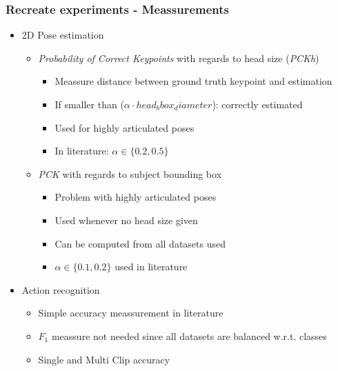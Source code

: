 \documentclass[9pt]{beamer}
\newenvironment{myframe}[1][]{%
\begin{frame}%
\frametitle{#1}
\setcounter{footnote}{0}


}{%
\end{frame}%
}
\begin{document}
\begin{myframe}[Recreate experiments - Meassurements]
    \begin{itemize}
        \item 2D Pose estimation
        \begin{itemize}
            \item \textit{Probability of Correct Keypoints} with regards to head size (\textit{PCKh})
            \begin{itemize}
                \item Meassure distance between ground truth keypoint and estimation
                \item If smaller than ($\alpha \cdot head_bbox_diameter$): correctly estimated
                \item Used for highly articulated poses
                \item In literature: $\alpha \in \{0.2, 0.5\}$
            \end{itemize}    
            \item \textit{PCK} with regards to subject bounding box
            \begin{itemize}
                \item Problem with highly articulated poses
                \item Used whenever no head size given
                \item Can be computed from all datasets used
                \item $\alpha \in \{0.1, 0.2\}$ used in literature
            \end{itemize}
        \end{itemize}
        \item Action recognition
        \begin{itemize}
            \item Simple accuracy meassurement in literature
            \item $F_1$ meassure not needed since all datasets are balanced w.r.t. classes
            \item Single and Multi Clip accuracy
        \end{itemize}
    \end{itemize}
\end{myframe}
\end{document}

